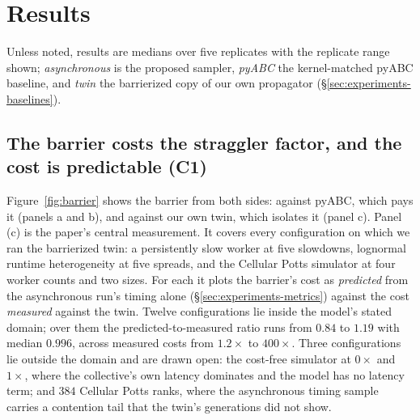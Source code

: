 \documentclass[pdflatex,sn-mathphys-num]{sn-jnl}
\theoremstyle{plain}
\theoremstyle{definition}
\begin{document}
\section{Results}\label{sec:results}
Unless noted, results are medians over five replicates with the replicate range shown; \emph{asynchronous} is the proposed sampler, \emph{pyABC} the kernel-matched pyABC baseline, and \emph{twin} the barrierized copy of our own propagator (\S\ref{sec:experiments-baselines}).

\subsection{The barrier costs the straggler factor, and the cost is predictable (C1)}\label{sec:results-barrier}

Figure~\ref{fig:barrier} shows the barrier from both sides: against pyABC, which pays it (panels a and b), and against our own twin, which isolates it (panel c). Panel (c) is the paper's central measurement. It covers every configuration on which we ran the barrierized twin: a persistently slow worker at five slowdowns, lognormal runtime heterogeneity at five spreads, and the Cellular Potts simulator at four worker counts and two sizes. For each it plots the barrier's cost as \emph{predicted} from the asynchronous run's timing alone (\S\ref{sec:experiments-metrics}) against the cost \emph{measured} against the twin. Twelve configurations lie inside the model's stated domain; over them the predicted-to-measured ratio runs from $0.84$ to $1.19$ with median $0.996$, across measured costs from $1.2\times$ to $400\times$. Three configurations lie outside the domain and are drawn open: the cost-free simulator at $0\times$ and $1\times$, where the collective's own latency dominates and the model has no latency term; and $384$ Cellular Potts ranks, where the asynchronous timing sample carries a contention tail that the twin's generations did not show.
\end{document}
